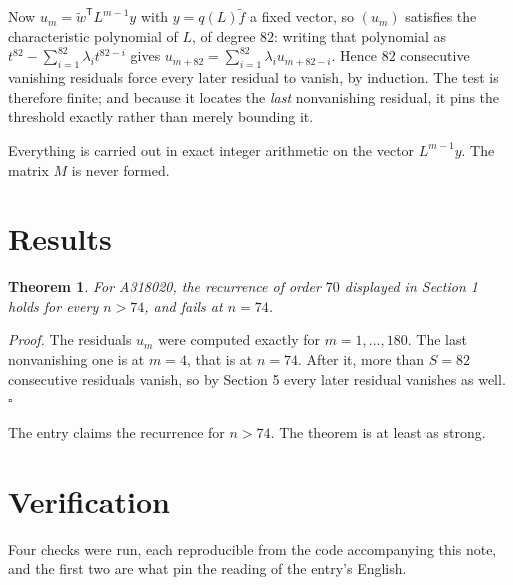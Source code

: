 \documentclass[11pt]{article}
\newtheorem{theorem}{Theorem}
\theoremstyle{definition}
\begin{document}
Now $u_m = \tilde w^{\mathsf T} L^{m-1} y$ with $y = q(L)\tilde f$ a fixed vector, so $(u_m)$ satisfies the characteristic polynomial of $L$, of degree $82$: writing that polynomial as $t^{82} - \sum_{i=1}^{82} \lambda_i t^{82-i}$ gives $u_{m+82} = \sum_{i=1}^{82} \lambda_i u_{m+82-i}$. Hence $82$ consecutive vanishing residuals force every later residual to vanish, by induction. The test is therefore finite; and because it locates the {\itshape last} nonvanishing residual, it pins the threshold exactly rather than merely bounding it.

Everything is carried out in exact integer arithmetic on the vector $L^{m-1}y$. The matrix $M$ is never formed.

\section{Results}

\begin{theorem} For A318020, the recurrence of order $70$ displayed in Section 1 holds for every $n > 74$, and fails at $n = 74$.\end{theorem}

{\itshape Proof.} The residuals $u_m$ were computed exactly for $m = 1,\dots,180$. The last nonvanishing one is at $m = 4$, that is at $n = 74$. After it, more than $S = 82$ consecutive residuals vanish, so by Section 5 every later residual vanishes as well. $\square$

The entry claims the recurrence for $n > 74$. The theorem is at least as strong.

\section{Verification}

Four checks were run, each reproducible from the code accompanying this note, and the first two are what pin the reading of the entry's English.
\end{document}
